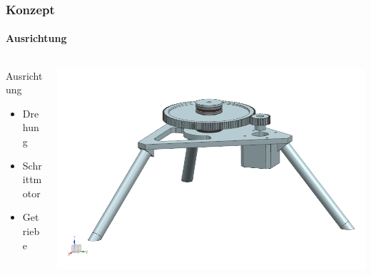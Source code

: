 \begin{frame}
    \frametitle{Konzept}
    \framesubtitle{Ausrichtung}
    \begin{columns}
        \begin{column}{0.4\textwidth}
            \begin{block}{Ausrichtung}
                \begin{itemize}
                    \item Drehung
                    \item Schrittmotor
                    \item Getriebe
                \end{itemize}
            \end{block}
        \end{column}
        \begin{column}{0.6\textwidth}
            \centering
            \includegraphics[width=1.0\textwidth, trim = 20mm 23mm 5mm 15mm, clip]{../doc/fig/Bild_Drehturm.png}
        \end{column}
    \end{columns}
\end{frame}

